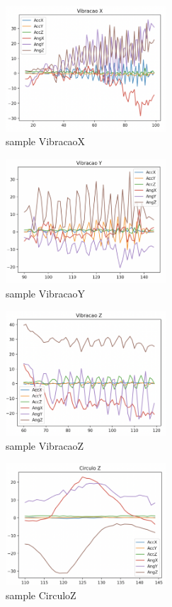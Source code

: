 \begin{figure}[H]
    \center
    \includegraphics[width=6cm]{images/sampleVibracaoX.png}
    \caption{ sample VibracaoX }
\end{figure}
\begin{figure}[H]
    \center
    \includegraphics[width=6cm]{images/sampleVibracaoY.png}
    \caption{ sample VibracaoY}
\end{figure}
\begin{figure}[H]
    \center
    \includegraphics[width=6cm]{images/sampleVibracaoZ.png}
    \caption{ sample VibracaoZ}
\end{figure}
\begin{figure}[H]
    \center
    \includegraphics[width=6cm]{images/sampleCirculoZ.png}
    \caption{ sample CirculoZ }
\end{figure}
